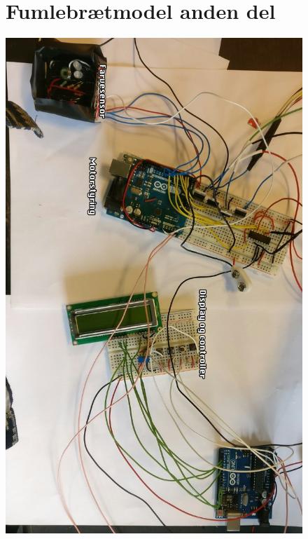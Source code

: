 \begin{figure}[H]
\section{Fumlebrætmodel anden del}
	\centering
    \includegraphics[width=13cm]{figures/2_5fremstilling/prototyper/rumleKreds.png}
\end{figure}



 
 

